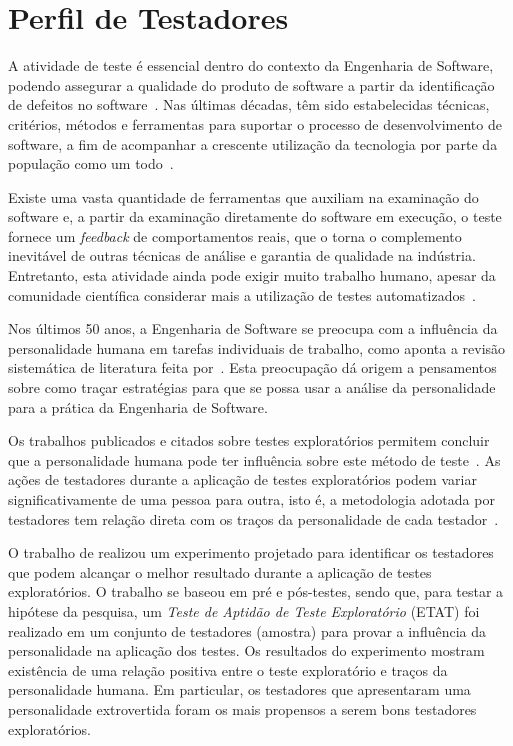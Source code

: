 \section{Perfil de Testadores}
\label{sec:perfil_testadores}


A atividade de teste é essencial dentro do contexto da Engenharia de Software, podendo assegurar a qualidade do produto de software a partir da identificação de defeitos no software~\cite{myers2004art}. Nas últimas décadas, têm sido estabelecidas técnicas, critérios, métodos
e ferramentas para suportar o processo de desenvolvimento de software, a fim de acompanhar a crescente utilização da tecnologia por parte da população como um todo~\cite{maldonado2004introduccao}.

Existe uma vasta quantidade de ferramentas que auxiliam na examinação do software e, a partir da examinação diretamente do software em execução, o teste fornece um \textit{feedback} de comportamentos reais, que o torna o complemento inevitável de outras técnicas de análise e garantia de qualidade na indústria. Entretanto, esta atividade ainda pode exigir muito trabalho humano, apesar da comunidade científica considerar mais a utilização de testes automatizados~\cite{bertolino2007software}.

Nos últimos 50 anos, a Engenharia de Software se preocupa com a influência da personalidade humana em tarefas individuais de trabalho, como aponta a revisão sistemática de literatura feita por~\cite{cruz2011personality}. Esta preocupação dá origem a pensamentos sobre como traçar estratégias para que se possa usar a análise da personalidade para a prática da Engenharia de Software. 

Os trabalhos publicados e citados sobre testes exploratórios permitem concluir que a personalidade humana pode ter influência sobre este método de teste~\cite{bach2003exploratory, whittaker2009exploratory, itkonen2015test, itkonen2012role, shoaib2009empirical}. As ações de testadores durante a aplicação de testes exploratórios podem variar significativamente de uma pessoa para outra, isto é, a metodologia adotada por testadores tem relação direta com os traços da personalidade de cada testador~\cite{shoaib2009empirical}. 

O trabalho de \cite{shoaib2009empirical} realizou um experimento projetado para identificar os testadores que podem alcançar o melhor resultado durante a aplicação de testes exploratórios. O trabalho se baseou em pré e pós-testes, sendo que, para testar a hipótese da pesquisa, um \textit{Teste de Aptidão de Teste Exploratório} (ETAT) foi realizado em um conjunto de testadores (amostra) para provar a influência da personalidade na aplicação dos testes. Os resultados do experimento mostram existência de uma relação positiva entre o teste exploratório e traços da personalidade humana. Em particular, os testadores que apresentaram uma personalidade extrovertida foram os mais propensos a serem bons testadores exploratórios.


